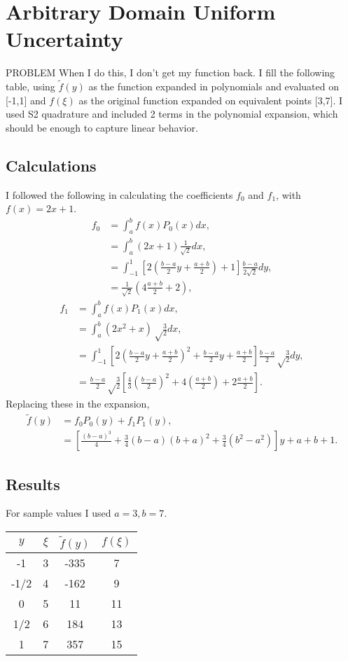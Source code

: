 \documentclass[11pt]{article} %
\newcommand{\into}{\ensuremath{\int_{-1}^1}}
\begin{document}
\section{Arbitrary Domain Uniform Uncertainty}


PROBLEM
When I do this, I don't get my function back.  I fill the following table, using $\tilde f(y)$ as the function expanded in polynomials and evaluated on [-1,1] and $f(\xi)$ as the original function expanded on equivalent points [3,7].  I used S2 quadrature and included 2 terms in the polynomial expansion, which should be enough to capture linear behavior.
\subsection{Calculations}
I followed the following in calculating the coefficients $f_0$ and $f_1$, with $f(x)=2x+1$.
\begin{align}
f_0 &= \int_a^b f(x)P_0(x)dx, \\
  &= \int_a^b (2x+1)\frac{1}{\sqrt{2}} dx,\\
  &= \int_{-1}^1 \left[2\left(\frac{b-a}{2}y+\frac{a+b}{2}\right)+1\right]\frac{b-a}{2\sqrt{2}}dy,\\
  &=\frac{1}{\sqrt{2}}\left(4\frac{a+b}{2}+2\right),
\end{align}
\begin{align}
f_1 &=  \int_a^b f(x)P_1(x)dx, \\
  &= \int_a^b (2x^2+x)\sqrt\frac{3}{2} dx,\\
  &=\into \left[2\left(\frac{b-a}{2}y+\frac{a+b}{2}\right)^2+\frac{b-a}{2}y+\frac{a+b}{2}\right]\frac{b-a}{2}\sqrt\frac{3}{2}dy,\\
  &=\frac{b-a}{2}\sqrt\frac{3}{2}\left[\frac{4}{3}\left(\frac{b-a}{2}\right)^2+4\left(\frac{a+b}{2}\right)+2\frac{a+b}{2}\right].
\end{align}
Replacing these in the expansion,
\begin{align}
\tilde f(y)&=f_0P_0(y) + f_1P_1(y),\\
  &=\left[\frac{(b-a)^3}{4}+\frac{3}{4}(b-a)(b+a)^2+\frac{3}{4}(b^2-a^2)\right]y + a + b + 1.
\end{align}


\subsection{Results}
For sample values I used $a=3,b=7$.

\centering
\begin{tabular}{c c|c c}
$y$ & $\xi$ & $\tilde f(y)$ & $f(\xi)$ \\ \hline
-1 & 3 & -335 & 7 \\
-1/2 & 4 & -162 & 9 \\
0 & 5 & 11&11\\
1/2 & 6 & 184&13\\
1 & 7 & 357&15
\end{tabular}
\end{document}
